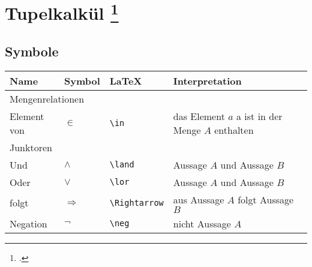 \documentclass{lehramt-informatik-haupt}
\begin{document}

\chapter{Tupelkalkül
\footcite[Seite 100]{kemper}}

%

\section{Symbole}

\begin{tabular}{l|l|l|l}
\textbf{Name} & \textbf{Symbol} & \textbf{LaTeX} & \textbf{Interpretation}\\

\hline
\hline

\multicolumn{4}{l}{Mengenrelationen} \\

\hline
\hline

Element von & $\in$ & \verb|\in| & das Element $a$  a ist in der Menge $A$ enthalten \\

\hline

\multicolumn{4}{l}{Junktoren} \\

\hline
\hline

Und & $\land$ & \verb|\land| & Aussage $A$ und Aussage $B$ \\

Oder & $\lor$ & \verb|\lor| & Aussage $A$ und Aussage $B$ \\

folgt & $\Rightarrow$ & \verb|\Rightarrow| & aus Aussage $A$ folgt Aussage $B$ \\

Negation & $\neg$ & \verb|\neg| & nicht Aussage $A$\\


\end{tabular}
\end{document}
